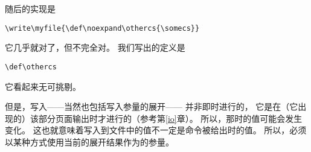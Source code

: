 \documentclass{book}
\begin{document}
随后的实现是
\begin{verbatim}
\write\myfile{\def\noexpand\othercs{\somecs}}
\end{verbatim}
它几乎就对了，但不完全对。
我们写出的定义是
\begin{disp}\verb>\def\othercs>\rb\end{disp}
它看起来无可挑剔。

但是，写入——当然也包括写入参量的展开——
并非即时进行的，
它是在（它出现的）该部分页面输出时才进行的（参考第\ref{io}章）。
所以，那时的值可能会发生变化。
这也就意味着写入到文件中的值不一定是命令被给出时的值。
所以，必须以某种方式使用当前的展开结果作为的参量。
\end{document}
